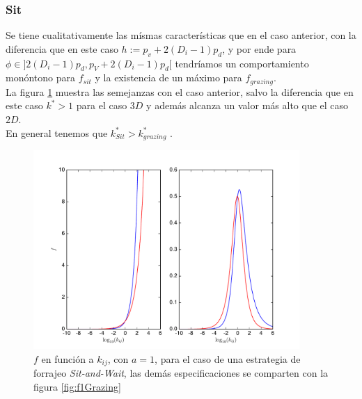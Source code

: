 \subsubsection{Sit}

Se tiene cualitativamente las m\'ismas caracter\'isticas que en el caso anterior, con la diferencia que en este caso $ h:= p_v + 2(D_i -1) p_d$, y por ende para $\phi \in ]2(D_i - 1) p_d , p_V + 2(D_i -1)p_d[$ tendr\'iamos un comportamiento mon\'ontono para $f_{sit}$ y la existencia de un m\'aximo para $f_{grazing}$.\\

La figura \ref{fig:f1Sit} muestra las semejanzas con el caso anterior, salvo la diferencia que en este caso $k^*>1$ para el caso $3D$ y adem\'as alcanza un valor m\'as alto que el caso $2D$.\\
En general tenemos que $ k^*_{Sit} > k^*_{grazing}$ .

\begin{figure}
\begin{center}
 \includegraphics[width=0.9\textwidth]{./Plots/f1Sit.pdf}
 \caption[$f_1, Sit$]{$f$ en funci\'on a $k_{ij}$, con $a =1$, para el caso de una estrategia de forrajeo \emph{Sit-and-Wait}, las dem\'as especificaciones se comparten con la figura \ref{fig:f1Grazing}}
 \label{fig:f1Sit} 
\end{center}
\end{figure}

